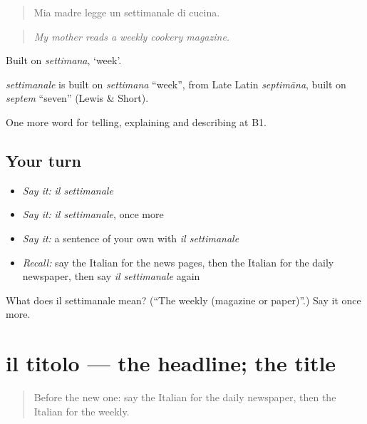 \begin{quote}
Mia madre legge un settimanale di cucina.
\end{quote}

\begin{quote}
\emph{My mother reads a weekly cookery magazine.}
\end{quote}

Built on \emph{settimana}, ‘week’.

\begin{cousinweb}
\emph{settimanale} is built on \emph{settimana} \textquotedblleft{}week\textquotedblright{}, from Late Latin \emph{septimāna}, built on \emph{septem} \textquotedblleft{}seven\textquotedblright{} (Lewis \& Short).
\end{cousinweb}

\begin{grammarlens}[title={What you've built}]
One more word for telling, explaining and describing at B1.
\end{grammarlens}

\subsection*{Your turn}
\begin{itemize}
\raggedright
  \item \emph{Say it:} \emph{il settimanale}
  \item \emph{Say it:} \emph{il settimanale}, once more
  \item \emph{Say it:} a sentence of your own with \emph{il settimanale}
  \item \emph{Recall:} say the Italian for the news pages, then the Italian for the daily newspaper, then say \emph{il settimanale} again
\end{itemize}

\begin{tcolorbox}[breakable,colback=teal!4,colframe=teal!35!black,title={Before you move on}]
What does il settimanale mean? (\textquotedblleft{}The weekly (magazine or paper)\textquotedblright{}.) Say it once more.
\end{tcolorbox}
\section[il titolo]{il titolo — the headline; the title}

\label{lesson:IT-C282-titolo}



\begin{quote}
Before the new one: say the Italian for the daily newspaper, then the Italian for the weekly.
\end{quote}

